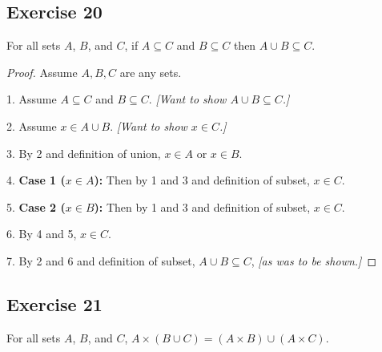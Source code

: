 \documentclass[14pt]{extarticle}
\begin{document}
\subsection{Exercise 20}
For all sets $A$, $B$, and $C$, if \(A \subseteq C\) and \(B \subseteq C\) then \(A \cup B \subseteq C\).

\begin{proof}
  Assume $A,B,C$ are any sets.

  1. Assume \(A \subseteq C\) and \(B \subseteq C\). {\it [Want to show \(A \cup B \subseteq C\).]}

  2. Assume \(x \in A \cup B\). {\it [Want to show \(x \in C\).]}

  3. By 2 and definition of union, $x \in A$ or $x \in B$.

  4. {\bf Case 1 ($x \in A$):} Then by 1 and 3 and definition of subset, $x \in C$.

  5. {\bf Case 2 ($x \in B$):} Then by 1 and 3 and definition of subset, $x \in C$.

  6. By 4 and 5, $x \in C$.

  7. By 2 and 6 and definition of subset, \(A \cup B \subseteq C\), {\it [as was to be shown.]}
\end{proof}

\subsection{Exercise 21}
For all sets $A$, $B$, and $C$, \(A \times (B \cup C) = (A \times B) \cup (A \times C)\).
\end{document}
